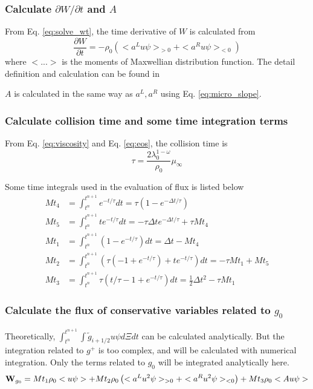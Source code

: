 \documentclass[a4paper]{book}
\begin{document}
\subsubsection*{Calculate ${\partial W}/{\partial t}$ and $A$}
From Eq. \ref{eq:solve_wt}, the time derivative of $W$ is calculated from
$$\frac{\partial W}{\partial t}=-\rho_0\left(<a^Lu\psi>_{>0}+<a^Ru\psi>_{<0}\right)$$
where $<...>$ is the moments of Maxwellian distribution function. The detail definition and calculation can be found in 

$A$ is calculated in the same way as $a^L,a^R$ using Eq. \ref{eq:micro_slope}.

\subsubsection*{Calculate collision time and some time integration terms}
From Eq. \ref{eq:viscosity} and Eq. \ref{eq:eos}, the collision time is
$$\tau = \frac{2\lambda_0^{1-\omega}}{\rho_0}\mu_{\infty}$$

Some time integrals used in the evaluation of flux is listed below
$$
\begin{aligned}
    Mt_4 &= \int_{t^n}^{t^{n+1}} e^{-t/\tau}dt = \tau(1-e^{-\Delta t/\tau}) \\
    Mt_5 &= \int_{t^n}^{t^{n+1}} te^{-t/\tau}dt = -\tau\Delta t e^{-\Delta t/\tau}+\tau Mt_4 \\
    Mt_1 &= \int_{t^n}^{t^{n+1}} (1-e^{-t/\tau})dt = \Delta t-Mt_4 \\
    Mt_2 &= \int_{t^n}^{t^{n+1}} (\tau(-1+e^{-t/\tau})+te^{-t/\tau})dt = -\tau Mt_1+Mt_5 \\
    Mt_3 &= \int_{t^n}^{t^{n+1}} \tau(t/\tau-1+e^{-t/\tau})dt = \frac{1}{2}\Delta t^2-\tau Mt_1
\end{aligned} 
$$

\subsubsection*{Calculate the flux of conservative variables related to $g_0$}
Theoretically, $\int_{t^n}^{t^{n+1}}\int {\tilde g}_{i+1/2}u\psi d\Xi dt$ can be calculated analytically. But the integration related to $g^+$ is too complex, and will be calculated with numerical integration. Only the terms related to $g_0$ will be integrated analytically here.
$${\bf W}_{g_0} = Mt_1\rho_0<u\psi>+Mt_2\rho_0\left(<a^Lu^2\psi>_{>0}+<a^Ru^2\psi>_{<0}\right)+Mt_3\rho_0<Au\psi>$$
\end{document}
